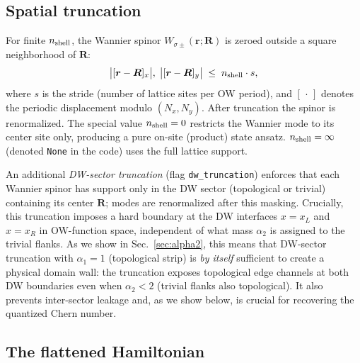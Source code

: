 \documentclass[aps,prb,twocolumn,showpacs,floatfix]{revtex4-2}
\newcommand{\nshell}{n_{\rm shell}}
\begin{document}
\subsection{Spatial truncation}

For finite $\nshell$, the Wannier spinor $W_{\sigma\pm}(\bm{r};\bm{R})$ is
zeroed outside a square neighborhood of $\bm{R}$:
\begin{equation}
\bigl|[\bm{r} - \bm{R}]_{x}\bigr|,\;
\bigl|[\bm{r} - \bm{R}]_{y}\bigr| \;\leq\; \nshell \cdot s,
\label{eq:shell_cut}
\end{equation}
where $s$ is the stride (number of lattice sites per OW period), and
$[\,\cdot\,]$ denotes the periodic displacement modulo $(N_x, N_y)$.
After truncation the spinor is renormalized.
The special value $\nshell = 0$ restricts the Wannier mode to its center site
only, producing a pure on-site (product) state ansatz.
$\nshell = \infty$ (denoted \texttt{None} in the code) uses the full lattice support.

An additional \emph{DW-sector truncation} (flag \texttt{dw\_truncation}) enforces
that each Wannier spinor has support only in the DW sector
(topological or trivial) containing its center $\bm{R}$; modes are renormalized
after this masking.
Crucially, this truncation imposes a hard boundary at the DW interfaces
$x = x_L$ and $x = x_R$ in OW-function space, independent of what mass $\alpha_2$
is assigned to the trivial flanks.
As we show in Sec.~\ref{sec:alpha2}, this means that DW-sector truncation with
$\alpha_1 = 1$ (topological strip) is \emph{by itself} sufficient to create a
physical domain wall: the truncation exposes topological edge channels at both
DW boundaries even when $\alpha_2 < 2$ (trivial flanks also topological).
It also prevents inter-sector leakage and, as we show below, is crucial for
recovering the quantized Chern number.

\subsection{The flattened Hamiltonian}
\end{document}
